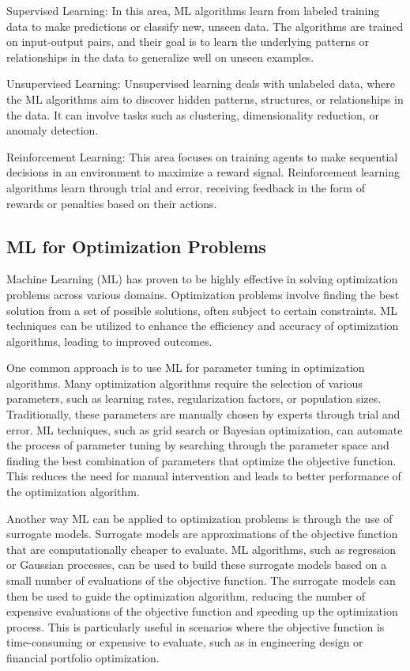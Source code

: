 Supervised Learning: In this area, ML algorithms learn from labeled training data to make predictions or classify new, unseen data. The algorithms are trained on input-output pairs, and their goal is to learn the underlying patterns or relationships in the data to generalize well on unseen examples.


Unsupervised Learning: Unsupervised learning deals with unlabeled data, where the ML algorithms aim to discover hidden patterns, structures, or relationships in the data. It can involve tasks such as clustering, dimensionality reduction, or anomaly detection.


Reinforcement Learning: This area focuses on training agents to make sequential decisions in an environment to maximize a reward signal. Reinforcement learning algorithms learn through trial and error, receiving feedback in the form of rewards or penalties based on their actions.


\subsection{ML for Optimization Problems}
Machine Learning (ML) has proven to be highly effective in solving optimization problems across various domains. Optimization problems involve finding the best solution from a set of possible solutions, often subject to certain constraints. ML techniques can be utilized to enhance the efficiency and accuracy of optimization algorithms, leading to improved outcomes.

One common approach is to use ML for parameter tuning in optimization algorithms. Many optimization algorithms require the selection of various parameters, such as learning rates, regularization factors, or population sizes. Traditionally, these parameters are manually chosen by experts through trial and error. ML techniques, such as grid search or Bayesian optimization, can automate the process of parameter tuning by searching through the parameter space and finding the best combination of parameters that optimize the objective function. This reduces the need for manual intervention and leads to better performance of the optimization algorithm.

Another way ML can be applied to optimization problems is through the use of surrogate models. Surrogate models are approximations of the objective function that are computationally cheaper to evaluate. ML algorithms, such as regression or Gaussian processes, can be used to build these surrogate models based on a small number of evaluations of the objective function. The surrogate models can then be used to guide the optimization algorithm, reducing the number of expensive evaluations of the objective function and speeding up the optimization process. This is particularly useful in scenarios where the objective function is time-consuming or expensive to evaluate, such as in engineering design or financial portfolio optimization.

